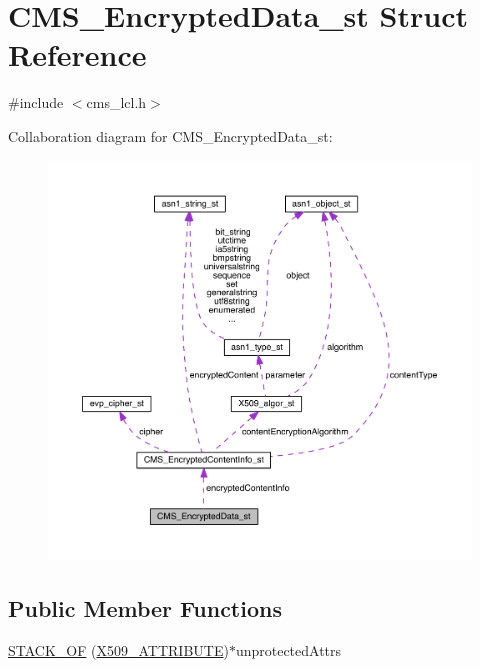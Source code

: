 \hypertarget{struct_c_m_s___encrypted_data__st}{}\section{C\+M\+S\+\_\+\+Encrypted\+Data\+\_\+st Struct Reference}
\label{struct_c_m_s___encrypted_data__st}


{\ttfamily \#include $<$cms\+\_\+lcl.\+h$>$}



Collaboration diagram for C\+M\+S\+\_\+\+Encrypted\+Data\+\_\+st\+:\nopagebreak
\begin{figure}[H]
\begin{center}
\leavevmode
\includegraphics[width=350pt]{struct_c_m_s___encrypted_data__st__coll__graph}
\end{center}
\end{figure}
\subsection*{Public Member Functions}
\begin{DoxyCompactItemize}
\item 
\hyperlink{struct_c_m_s___encrypted_data__st_ad46bfc9f05be7790c016ea9af01e5280}{S\+T\+A\+C\+K\+\_\+\+OF} (\hyperlink{crypto_2x509_2x509_8h_aa4f1a62a9d2dd8cb6780fe2713737c0f}{X509\+\_\+\+A\+T\+T\+R\+I\+B\+U\+TE})$\ast$unprotected\+Attrs
\end{DoxyCompactItemize}
